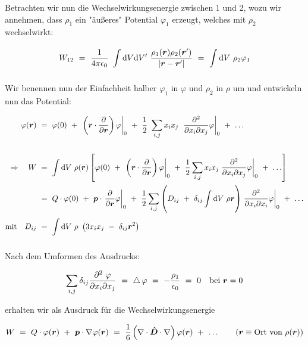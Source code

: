 Betrachten wir nun die Wechselwirkungsenergie zwischen 1 und 2, wozu wir annehmen, dass $\rho_1$ ein "äußeres" Potential $\varphi_1$ erzeugt, welches mit $\rho_2$ wechselwirkt:

\begin{equation*}
W_{12} \ = \  \frac{1}{4\pi\epsilon_0} \ \int\d V \d V' \ \frac{\rho_1(\vec{r})\rho_2(\vec{r}')}{|\vec{r}-\vec{r}'|} \ = \ \Int{}{}{V} \rho_2\varphi_1
\end{equation*}

Wir benennen nun der Einfachheit halber $\varphi_1$ in $\varphi$ und $\rho_2$ in $\rho$ um und entwickeln nun das Potential:

\begin{align*}
\varphi(\vec{r})  \ &= \  \varphi(0) \ + \ \left.\left(\vec{r}\cdot\pdiff{}{\vec{r}}\right)\varphi\right|_0 \ + \ \frac{1}{2}\ \sum_{i,j} x_i x_j \ \left.\frac{\partial ^2}{\partial x_i  \partial x_j}\varphi\right|_0 \ + \ \ldots \\
\ \\
\Rightarrow \quad W \ &= \ \Int{}{}{V}\rho(\vec{r})\left[\varphi(0) \ + \ \left.\left(\vec{r}\cdot\pdiff{}{\vec{r}}\right)\varphi\right|_0 \ + \ \frac{1}{2} \sum_{i,j}x_i x_j \left.\frac{\partial^2}{\partial x_i \partial x_j}\varphi\right|_0 \ + \ \ldots\right]\\
&= \ Q\cdot\varphi(0) \ + \ \vec{p}\cdot\left.\pdiff{}{\vec{r}}\varphi\right|_0 \ + \ \frac{1}{2}\sum_{i,j}\left(D_{ij} \ + \ \delta_{ij}\Int{}{}{V}\rho\vec{r}\right)\left.\frac{\partial^2}{\partial x_i \partial x_i}\varphi\right|_0 \ + \ \ldots\\
\text{mit} \quad D_{ij} \ &= \ \Int{}{}{V} \rho \ \left(3x_i x_j\ - \ \delta_{ij}\vec{r}^2\right)
\end{align*}

Nach dem Umformen des Ausdrucks:

\begin{equation*}
\sum_{i,j} \delta_{ij}\frac{\partial^2 \ \varphi}{\partial x_i \partial x_j} \ = \ \laplace\varphi  \ = \ -\frac{\rho_1}{\epsilon_0}  \ = \ 0 \quad \text{bei } \vec{r}=0
\end{equation*}

erhalten wir als Ausdruck für die Wechselwirkungsenergie

\begin{equation*}
W \ = \ Q\cdot\varphi(\vec{r}) \ + \ \vec{p}\cdot\nabla\varphi(\vec{r})  \ = \ \frac{1}{6}\left(\nabla\cdot\tens{D}\cdot\nabla\right)\varphi(\vec{r}) \ + \ \ldots \qquad(\vec{r}\equiv \text{Ort von }\rho(\vec{r}))
\end{equation*}

